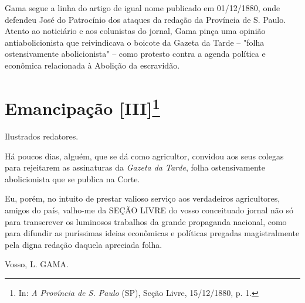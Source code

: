 {\small\noindent
Gama segue a linha do artigo de igual nome publicado em
01/12/1880, onde defendeu José do Patrocínio dos ataques da redação da
Província de S. Paulo. Atento ao noticiário e aos colunistas do jornal,
Gama pinça uma opinião antiabolicionista que reivindicava o boicote da
Gazeta da Tarde -- "folha ostensivamente abolicionista" -- como protesto
contra a agenda política e econômica relacionada à Abolição da
escravidão. 

\chapter{Emancipação {[}III{]}\footnote[*]{In: \emph{A Província de
  S. Paulo} (SP), Seção Livre, 15/12/1880, p. 1.}}


Ilustrados redatores.

Há poucos dias, alguém, que se dá como agricultor, convidou aos seus
colegas para rejeitarem as assinaturas da \emph{Gazeta da Tarde}, folha
ostensivamente abolicionista que se publica na Corte.

Eu, porém, no intuito de prestar valioso serviço aos verdadeiros
agricultores, amigos do país, valho-me da SEÇÃO LIVRE do vosso
conceituado jornal não só para transcrever os luminosos trabalhos da
grande propaganda nacional, como para difundir as puríssimas ideias
econômicas e políticas pregadas magistralmente pela digna redação
daquela apreciada folha.

Vosso, L. GAMA.

\pagebreak
\mbox{}\vfill
\thispagestyle{empty}

}
